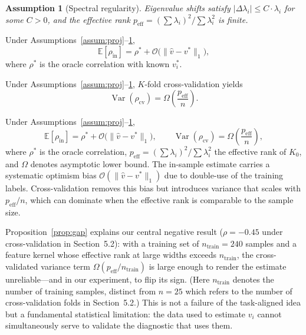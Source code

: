 \documentclass[twoside,11pt]{article}
\newtheorem{assumption}{Assumption}
\begin{document}
\begin{assumption}[Spectral regularity]
\label{assum:spec}
Eigenvalue shifts satisfy $|\Delta\lambda_i| \leq C \cdot \lambda_i$ for some $C > 0$, and the effective rank $p_{\text{eff}} = (\sum \lambda_i)^2 / \sum \lambda_i^2$ is finite.
\end{assumption}

\begin{lemma}
\label{lem:bias}
Under Assumptions~\ref{assum:proj}--\ref{assum:spec},
\[
\mathbb{E}[\rho_{\text{in}}] = \rho^* + \mathcal{O}\bigl(\|\hat{v} - v^*\|_1\bigr),
\]
where $\rho^*$ is the oracle correlation with known $v_i^*$.
\end{lemma}

\begin{lemma}
\label{lem:var}
Under Assumptions~\ref{assum:proj}--\ref{assum:spec}, $K$-fold cross-validation yields
\[
\operatorname{Var}(\rho_{\text{cv}}) = \Omega\!\left(\frac{p_{\text{eff}}}{n}\right).
\]
\end{lemma}

\begin{proposition}
\label{prop:gap}
Under Assumptions~\ref{assum:proj}--\ref{assum:spec},
\[
\mathbb{E}[\rho_{\text{in}}] = \rho^* + \mathcal{O}\bigl(\|\hat{v} - v^*\|_1\bigr),\qquad
\operatorname{Var}(\rho_{\text{cv}}) = \Omega\!\left(\frac{p_{\text{eff}}}{n}\right),
\]
where $\rho^*$ is the oracle correlation, $p_{\text{eff}} = (\sum \lambda_i)^2 / \sum \lambda_i^2$ the effective rank of $K_0$, and $\Omega$ denotes asymptotic lower bound.  The in-sample estimate carries a systematic optimism bias $\mathcal{O}(\|\hat{v} - v^*\|_1)$ due to double-use of the training labels.  Cross-validation removes this bias but introduces variance that scales with $p_{\text{eff}} / n$, which can dominate when the effective rank is comparable to the sample size.
\end{proposition}

Proposition~\ref{prop:gap} explains our central negative result ($\rho = -0.45$ under cross-validation in Section~5.2): with a training set of $n_{\text{train}}=240$ samples and a feature kernel whose effective rank at large widths exceeds $n_{\text{train}}$, the cross-validated variance term $\Omega(p_{\text{eff}} / n_{\text{train}})$ is large enough to render the estimate unreliable---and in our experiment, to flip its sign. (Here $n_{\text{train}}$ denotes the number of training samples, distinct from $n=25$ which refers to the number of cross-validation folds in Section~5.2.)  This is not a failure of the task-aligned idea but a fundamental statistical limitation: the data used to estimate $v_i$ cannot simultaneously serve to validate the diagnostic that uses them.
\end{document}

